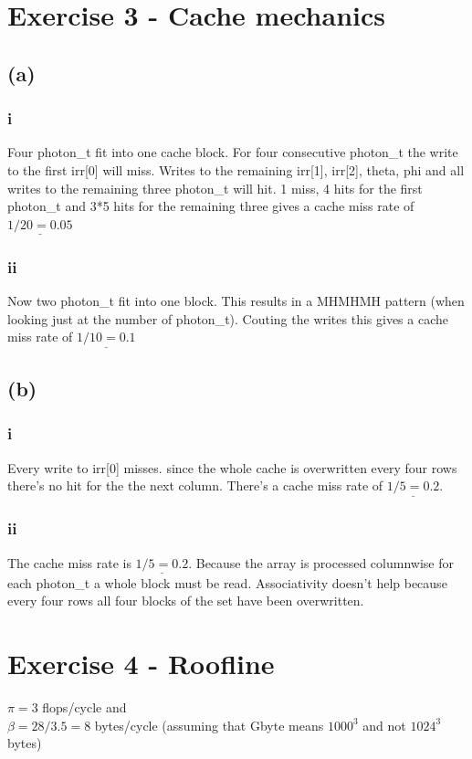 \documentclass[10pt,a4paper,oneside,notitlepage]{report}
\begin{document}
\section*{Exercise 3 - Cache mechanics}
\subsection*{(a)}
\subsubsection*{i}
Four photon\_t fit into one cache block. For four consecutive photon\_t the write to the first irr[0] will miss. Writes to the remaining irr[1], irr[2], theta, phi and all writes to the remaining three photon\_t will hit. 1 miss, 4 hits for the first photon\_t and 3*5 hits for the remaining three gives a cache miss rate of $\underline{1/20=0.05}$
\subsubsection*{ii}
Now two photon\_t fit into one block. This results in a MHMHMH pattern (when looking just at the number of photon\_t). Couting the writes this gives a cache miss rate of $\underline{1/10=0.1}$
\subsection*{(b)}
\subsubsection*{i}
Every write to irr[0] misses. since the whole cache is overwritten every four rows there's no hit for the the next column. There's a cache miss rate of $\underline{1/5=0.2}$.
\subsubsection*{ii}
The cache miss rate is $\underline{1/5=0.2}$. Because the array is processed columnwise for each photon\_t a whole block must be read. Associativity doesn't help because every four rows all four blocks of the set have been overwritten.

\section*{Exercise 4 - Roofline}
$\pi = 3$ flops/cycle and \\
$\beta = 28/3.5 =8$ bytes/cycle (assuming that Gbyte means $1000^3$ and not $1024^3$ bytes)
\end{document}
